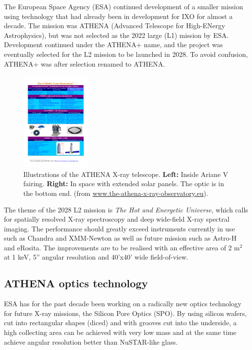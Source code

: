 The European Space Agency (ESA) continued development of a smaller mission using technology that had already been in development for IXO for almost a decade. The mission was ATHENA (Advanced Telescope for High-ENergy Astrophysics)\cite{Barcons:2012va}, but was not selected as the 2022 large (L1) mission by ESA. Development continued under the ATHENA+ name, and the project was eventually selected for the L2 mission to be launched in 2028. To avoid confusion, ATHENA+ was after selection renamed to ATHENA.

\begin{figure}[!h]
  \center
  \includegraphics[height=5cm]{figures/athena/athena_telescope.pdf}
\caption{\footnotesize Illustrations of the ATHENA X-ray telescope. \textbf{Left:} Inside Ariane V fairing. \textbf{Right:} In space with extended solar panels. The optic is in the bottom end. (from \url{www.the-athena-x-ray-observatory.eu}).}\label{fig:athena_telescope}
\end{figure}

The theme of the 2028 L2 mission is \emph{The Hot and Energetic Universe}, which calls for spatially resolved X-ray spectroscopy and deep wide-field X-ray spectral imaging. The performance should greatly exceed instruments currently in use such as Chandra and XMM-Newton as well as future mission such as Astro-H and eRosita. The improvements are to be realised with an effective area of 2 m$^2$ at 1 keV, 5'' angular resolution and 40'x40' wide field-of-view\cite{Willingale:2013vo}.

\subsection{ATHENA optics technology}\label{sec:athena_opt_tech}
ESA has for the past decade been working on a radically new optics technology for future X-ray missions, the Silicon Pore Optics (SPO)\cite{Barcons:2012va,Collon:2010bp,Collon:2006ky,Collon:2010bp,Collon:2006ky,Beijersbergen:2004cc}. By using silicon wafers, cut into rectangular shapes (diced) and with grooves cut into the underside, a high collecting area can be achieved with very low mass and at the same time achieve angular resolution better than NuSTAR-like glass.


